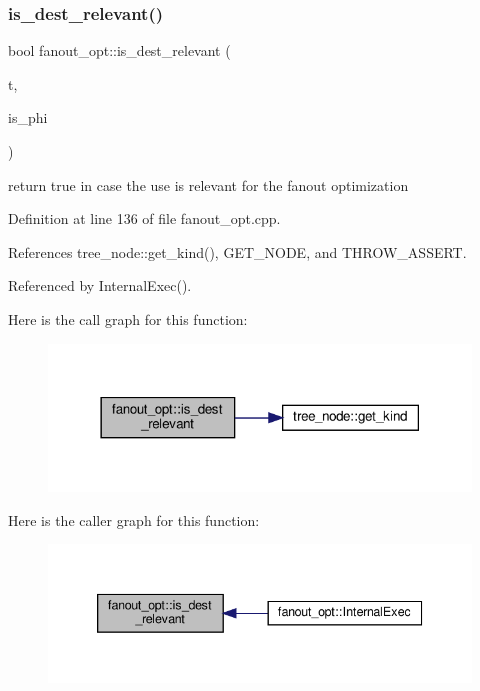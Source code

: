 \subsubsection{\texorpdfstring{is\+\_\+dest\+\_\+relevant()}{is\_dest\_relevant()}}
{\footnotesize\ttfamily bool fanout\+\_\+opt\+::is\+\_\+dest\+\_\+relevant (\begin{DoxyParamCaption}\item[{\hyperlink{tree__node_8hpp_a6ee377554d1c4871ad66a337eaa67fd5}{tree\+\_\+node\+Ref}}]{t,  }\item[{bool}]{is\+\_\+phi }\end{DoxyParamCaption})\hspace{0.3cm}{\ttfamily [private]}}



return true in case the use is relevant for the fanout optimization 



Definition at line 136 of file fanout\+\_\+opt.\+cpp.



References tree\+\_\+node\+::get\+\_\+kind(), G\+E\+T\+\_\+\+N\+O\+DE, and T\+H\+R\+O\+W\+\_\+\+A\+S\+S\+E\+RT.



Referenced by Internal\+Exec().

Here is the call graph for this function\+:
\nopagebreak
\begin{figure}[H]
\begin{center}
\leavevmode
\includegraphics[width=318pt]{dc/df3/classfanout__opt_a37b7c68c5c7bd86b3e27508da2544643_cgraph}
\end{center}
\end{figure}
Here is the caller graph for this function\+:
\nopagebreak
\begin{figure}[H]
\begin{center}
\leavevmode
\includegraphics[width=339pt]{dc/df3/classfanout__opt_a37b7c68c5c7bd86b3e27508da2544643_icgraph}
\end{center}
\end{figure}


